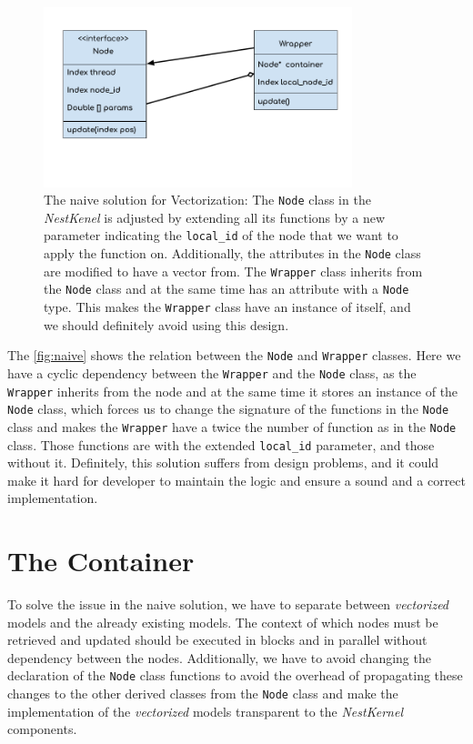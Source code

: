 \begin{figure}[h!]
\centering
\includegraphics[width=0.8\textwidth]{src/pic/wrapper.png}
\caption{The naive solution for Vectorization: The \texttt{Node} class in the \emph{NestKenel} is adjusted by extending all its functions by a new parameter indicating the \texttt{local_id} of the node that we want to apply the function on. Additionally, the attributes in the \texttt{Node} class are modified to have a vector from. The \texttt{Wrapper} class inherits from the \texttt{Node} class and at the same time has an attribute with a \texttt{Node} type. This makes the \texttt{Wrapper} class have an instance of itself, and we should definitely avoid using this design.}
\label{fig:naive}
\end{figure}

The \autoref{fig:naive} shows the relation between the \texttt{Node} and \texttt{Wrapper} classes. Here we have a cyclic dependency between the \texttt{Wrapper} and the \texttt{Node} class, as the \texttt{Wrapper} inherits from the node and at the same time it stores an instance of the \texttt{Node} class, which forces us to change the signature of the functions in  the \texttt{Node} class and makes the \texttt{Wrapper} have a twice the number of function as in the \texttt{Node} class. Those functions are with the extended \texttt{local\_id} parameter, and those without it. Definitely, this solution suffers from design problems, and it could make it hard for developer to maintain the logic and ensure a sound  and a correct implementation.

\section{The Container}

To solve the issue in the naive solution, we have to separate between \emph{vectorized} models and the already existing models. The context of which nodes must be retrieved and updated should be executed in blocks and in parallel without dependency between the nodes. Additionally, we have to avoid changing the declaration of the \texttt{Node} class functions to avoid the overhead of propagating these changes to the other derived classes from the \texttt{Node} class and make the implementation of the \emph{vectorized} models transparent to the \emph{NestKernel} components.



